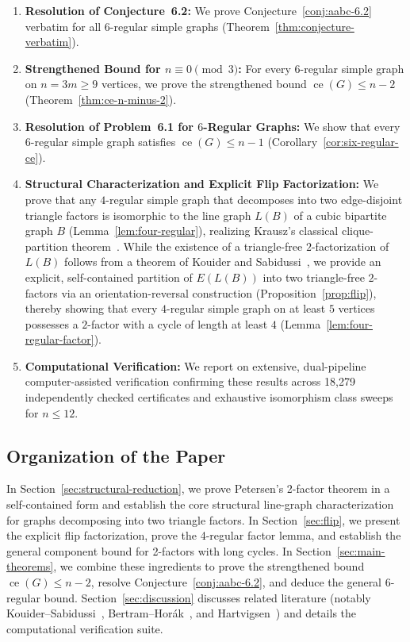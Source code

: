 \documentclass[11pt,reqno]{amsart}
\theoremstyle{definition}
\theoremstyle{remark}
\DeclareMathOperator{\ce}{ce}
\begin{document}
\begin{enumerate}[(1)]
    \item \textbf{Resolution of Conjecture~6.2:} We prove Conjecture~\ref{conj:aabc-6.2} verbatim for all $6$-regular simple graphs (Theorem~\ref{thm:conjecture-verbatim}).
    \item \textbf{Strengthened Bound for $n \equiv 0 \pmod 3$:} For every $6$-regular simple graph on $n = 3m \ge 9$ vertices, we prove the strengthened bound $\ce(G) \le n-2$ (Theorem~\ref{thm:ce-n-minus-2}).
    \item \textbf{Resolution of Problem~6.1 for $6$-Regular Graphs:} We show that every $6$-regular simple graph satisfies $\ce(G) \le n-1$ (Corollary~\ref{cor:six-regular-ce}).
    \item \textbf{Structural Characterization and Explicit Flip Factorization:} We prove that any $4$-regular simple graph that decomposes into two edge-disjoint triangle factors is isomorphic to the line graph $L(B)$ of a cubic bipartite graph $B$ (Lemma~\ref{lem:four-regular}), realizing Krausz's classical clique-partition theorem~\cite{Krausz43}. While the existence of a triangle-free $2$-factorization of $L(B)$ follows from a theorem of Kouider and Sabidussi~\cite{KS95}, we provide an explicit, self-contained partition of $E(L(B))$ into two triangle-free $2$-factors via an orientation-reversal construction (Proposition~\ref{prop:flip}), thereby showing that every $4$-regular simple graph on at least $5$ vertices possesses a $2$-factor with a cycle of length at least $4$ (Lemma~\ref{lem:four-regular-factor}).
    \item \textbf{Computational Verification:} We report on extensive, dual-pipeline computer-assisted verification confirming these results across 18,279 independently checked certificates and exhaustive isomorphism class sweeps for $n \le 12$.
\end{enumerate}

\subsection*{Organization of the Paper}
In Section~\ref{sec:structural-reduction}, we prove Petersen's 2-factor theorem in a self-contained form and establish the core structural line-graph characterization for graphs decomposing into two triangle factors. In Section~\ref{sec:flip}, we present the explicit flip factorization, prove the 4-regular factor lemma, and establish the general component bound for 2-factors with long cycles. In Section~\ref{sec:main-theorems}, we combine these ingredients to prove the strengthened bound $\ce(G) \le n-2$, resolve Conjecture~\ref{conj:aabc-6.2}, and deduce the general $6$-regular bound. Section~\ref{sec:discussion} discusses related literature (notably Kouider--Sabidussi~\cite{KS95}, Bertram--Hor\'ak~\cite{BH97}, and Hartvigsen~\cite{Hartvigsen24}) and details the computational verification suite.
\end{document}
